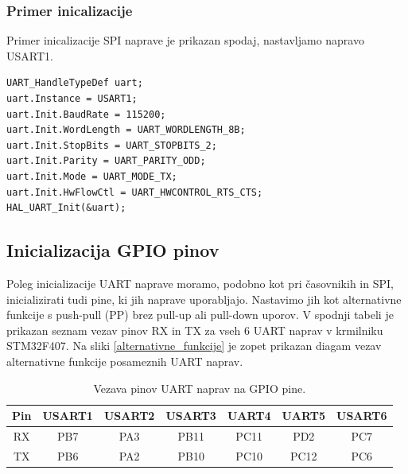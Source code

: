 \documentclass[12pt,letterpaper]{article}
\begin{document}
\subsubsection*{Primer inicalizacije}

Primer inicalizacije SPI naprave je prikazan spodaj, nastavljamo napravo USART1.

\begin{center}
\begin{lstlisting}[style=CStyle]
UART_HandleTypeDef uart;
uart.Instance = USART1;
uart.Init.BaudRate = 115200;
uart.Init.WordLength = UART_WORDLENGTH_8B;
uart.Init.StopBits = UART_STOPBITS_2;
uart.Init.Parity = UART_PARITY_ODD;
uart.Init.Mode = UART_MODE_TX;
uart.Init.HwFlowCtl = UART_HWCONTROL_RTS_CTS;
HAL_UART_Init(&uart);
\end{lstlisting}
\end{center}

\subsection*{Inicializacija GPIO pinov}

Poleg inicializacije UART naprave moramo, podobno kot pri časovnikih in SPI, inicializirati tudi pine, ki jih naprave uporabljajo. Nastavimo jih kot alternativne funkcije s push-pull (PP) brez pull-up ali pull-down uporov. V spodnji tabeli je prikazan seznam vezav pinov RX in TX za vseh 6 UART naprav v krmilniku STM32F407. Na sliki \ref{alternativne_funkcije} je zopet prikazan diagam vezav alternativne funkcije posameznih UART naprav.

\begin{table}[ht!]
    \small
    \caption{Vezava pinov UART naprav na GPIO pine.}
    \begin{center}
        \begin{tabular}{c|c|c|c|c|c|c}
            \textbf{Pin} & \textbf{USART1} & \textbf{USART2} & \textbf{USART3} & \textbf{UART4} & \textbf{UART5} & \textbf{USART6} \\ \hline
            RX & PB7 & PA3 & PB11 & PC11 & PD2 & PC7 \\ \hline
            TX & PB6 & PA2 & PB10 & PC10 & PC12 & PC6 \\
        \end{tabular}
    \end{center}
    \label{UARTPinsTable}
\end{table}
\end{document}
